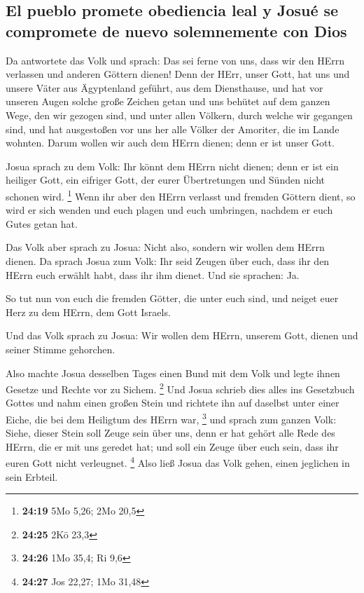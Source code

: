 \hypertarget{el-pueblo-promete-obediencia-leal-y-josuuxe9-se-compromete-de-nuevo-solemnemente-con-dios}{%
\subsection{El pueblo promete obediencia leal y Josué se compromete de
nuevo solemnemente con
Dios}\label{el-pueblo-promete-obediencia-leal-y-josuuxe9-se-compromete-de-nuevo-solemnemente-con-dios}}

 Da antwortete das Volk und sprach: Das sei ferne von
uns, dass wir den HErrn verlassen und anderen Göttern dienen!
 Denn der HErr, unser Gott, hat uns und unsere Väter aus
Ägyptenland geführt, aus dem Diensthause, und hat vor unseren Augen
solche große Zeichen getan und uns behütet auf dem ganzen Wege, den wir
gezogen sind, und unter allen Völkern, durch welche wir gegangen sind,
 und hat ausgestoßen vor uns her alle Völker der
Amoriter, die im Lande wohnten. Darum wollen wir auch dem HErrn dienen;
denn er ist unser Gott.

 Josua sprach zu dem Volk: Ihr könnt dem HErrn nicht
dienen; denn er ist ein heiliger Gott, ein eifriger Gott, der eurer
Übertretungen und Sünden nicht schonen wird. \footnote{\textbf{24:19}
  5Mo 5,26; 2Mo 20,5}  Wenn ihr aber den HErrn verlasst
und fremden Göttern dient, so wird er sich wenden und euch plagen und
euch umbringen, nachdem er euch Gutes getan hat.

 Das Volk aber sprach zu Josua: Nicht also, sondern wir
wollen dem HErrn dienen.  Da sprach Josua zum Volk: Ihr
seid Zeugen über euch, dass ihr den HErrn euch erwählt habt, dass ihr
ihm dienet. Und sie sprachen: Ja.

 So tut nun von euch die fremden Götter, die unter euch
sind, und neiget euer Herz zu dem HErrn, dem Gott Israels.

 Und das Volk sprach zu Josua: Wir wollen dem HErrn,
unserem Gott, dienen und seiner Stimme gehorchen.

 Also machte Josua desselben Tages einen Bund mit dem
Volk und legte ihnen Gesetze und Rechte vor zu Sichem. \footnote{\textbf{24:25}
  2Kö 23,3}  Und Josua schrieb dies alles ins Gesetzbuch
Gottes und nahm einen großen Stein und richtete ihn auf daselbst unter
einer Eiche, die bei dem Heiligtum des HErrn war, \footnote{\textbf{24:26}
  1Mo 35,4; Ri 9,6}  und sprach zum ganzen Volk: Siehe,
dieser Stein soll Zeuge sein über uns, denn er hat gehört alle Rede des
HErrn, die er mit uns geredet hat; und soll ein Zeuge über euch sein,
dass ihr euren Gott nicht verleugnet. \footnote{\textbf{24:27} Jos
  22,27; 1Mo 31,48}  Also ließ Josua das Volk gehen,
einen jeglichen in sein Erbteil.

